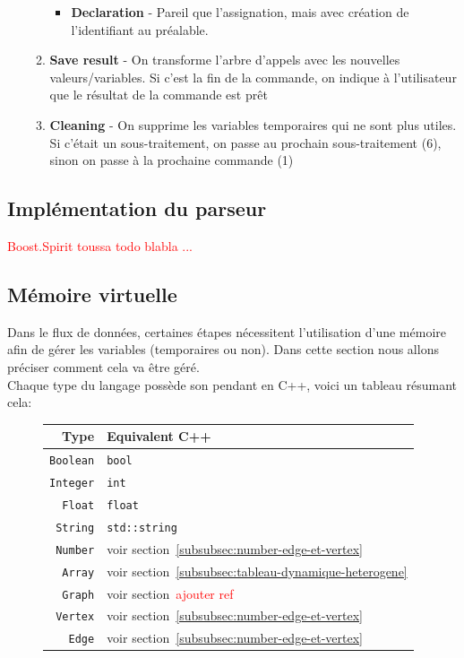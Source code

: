 \documentclass[french]{article}
\begin{document}
\begin{enumerate}
\begin{enumerate}
\begin{itemize}
						\item \textbf{Declaration} - Pareil que l'assignation, mais avec création de l'identifiant au préalable.
					\end{itemize}
					\item \textbf{Save result} - On transforme l'arbre d'appels avec les nouvelles valeurs/variables. Si c'est la fin de la commande, on indique à l'utilisateur que le résultat de la commande est prêt
					\item \textbf{Cleaning} - On supprime les variables temporaires qui ne sont plus utiles. Si c'était un sous-traitement, on passe au prochain sous-traitement (6), sinon on passe à la prochaine commande (1)
				\end{enumerate}
			\end{enumerate}
			
		\subsection{Implémentation du parseur}
			\label{subsec:implementation-du-parseur}
			\textcolor{red}{Boost.Spirit toussa todo blabla ...}
		
		\subsection{Mémoire virtuelle} 
			\label{subsec:memoire-virtuelle}
			Dans le flux de données, certaines étapes nécessitent l'utilisation d'une mémoire afin de gérer les variables (temporaires ou non). Dans cette section nous allons préciser comment cela va être géré.\\
			
			Chaque type du langage possède son pendant en C++, voici un tableau résumant cela:\\
			
			\begin{figure}[H]
				\centering
				\begin{tabular}{r|l}
					Type & Equivalent C++\\ \hline\hline
					\texttt{Boolean} & \texttt{bool}\\
					\texttt{Integer} & \texttt{int}\\
					\texttt{Float} & \texttt{float}\\
					\texttt{String} & \texttt{std::string}\\
					\texttt{Number} & voir section~\ref{subsubsec:number-edge-et-vertex}\\
					\texttt{Array} & voir section~\ref{subsubsec:tableau-dynamique-heterogene}\\
					\texttt{Graph} & voir section~\textcolor{red}{ajouter ref}\\
					\texttt{Vertex} & voir section~\ref{subsubsec:number-edge-et-vertex}\\
					\texttt{Edge} & voir section~\ref{subsubsec:number-edge-et-vertex}
				\end{tabular}
			\end{figure}
			
\end{document}
